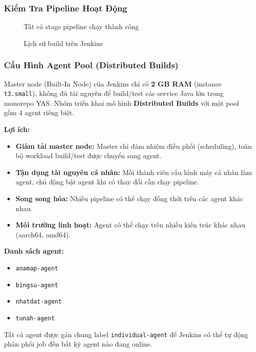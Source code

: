 \subsubsection{Kiểm Tra Pipeline Hoạt Động}

\begin{figure}[H]
\centering
{}
\caption{Tất cả stage pipeline chạy thành công}
\end{figure}

\begin{figure}[H]
\centering
{}
\caption{Lịch sử build trên Jenkins}
\end{figure}

\subsubsection{Cấu Hình Agent Pool (Distributed Builds)}

Master node (Built-In Node) của Jenkins chỉ có \textbf{2 GB RAM} (instance \texttt{t3.small}), không đủ tài nguyên để build/test các service Java lớn trong monorepo YAS. Nhóm triển khai mô hình \textbf{Distributed Builds} với một pool gồm 4 agent riêng biệt.

\textbf{Lợi ích:}
\begin{itemize}
    \item \textbf{Giảm tải master node:} Master chỉ đảm nhiệm điều phối (scheduling), toàn bộ workload build/test được chuyển sang agent.
    \item \textbf{Tận dụng tài nguyên cá nhân:} Mỗi thành viên cấu hình máy cá nhân làm agent, chủ động bật agent khi có thay đổi cần chạy pipeline.
    \item \textbf{Song song hóa:} Nhiều pipeline có thể chạy đồng thời trên các agent khác nhau.
    \item \textbf{Môi trường linh hoạt:} Agent có thể chạy trên nhiều kiến trúc khác nhau (aarch64, amd64).
\end{itemize}

\textbf{Danh sách agent:}
\begin{itemize}
    \item \texttt{anamap-agent}
    \item \texttt{bingsu-agent}
    \item \texttt{nhatdat-agent}
    \item \texttt{tunah-agent}
\end{itemize}

Tất cả agent được gán chung label \texttt{individual-agent} để Jenkins có thể tự động phân phối job đến bất kỳ agent nào đang online.

